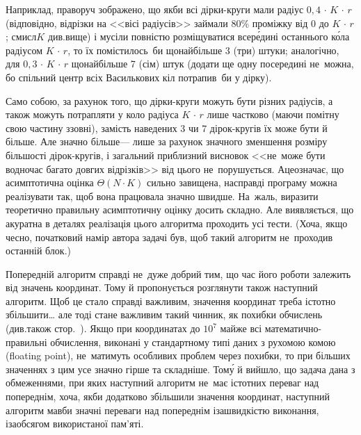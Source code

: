 Наприклад, праворуч зображено, що якби всі дірки-круги мали радіус ${0{,}4\,{\cdot}\,K\,{\cdot}\,r}$ (відповідно, відрізки на <<вісі радіусів>> займали 80\% проміжку від 0 до ${K\,{\cdot}\,r}$; смисл\nolinebreak[3] $K$ див.\nolinebreak[2] вище) і мусіли повністю розміщуватися всер\'{е}дині останнього к\'{о}ла радіусом ${K\,{\cdot}\,r}$, то їх помістилось~би щонайбільше 3 (три) штуки; аналогічно, для ${0{,}3\,{\cdot}\,K\,{\cdot}\,r}$ щонайбільше 7 (сім) штук (додати ще одну посередині не~можна, бо спільний центр всіх Василькових кіл потрапив~би у дірку).

Само собою, за рахунок того, що дірки-круги можуть бути різних радіусів, а також можуть потрапляти у коло радіуса ${K\,{\cdot}\,r}$ лише частково (маючи помітну свою частину ззовні), замість наведених 3 чи 7 дірок-кругів їх може бути й більше. Але значно більше\nolinebreak[3] --- лише за рахунок значного зменшення розміру більшості дірок-кругів, і загальний приблизний висновок <<не~може бути водночас багато довгих відрізків>> від цього не~порушується. А\nolinebreak[2] це\nolinebreak[2] означає, що асимптотична оцінка $\Theta(N\cdot{}K)$ сильно завищена, насправді програму можна реалізувати так, щоб вона працювала значно швидше. На~жаль, виразити теоретично правильну асимптотичну оцінку досить складно. Але виявляється, що акуратна в деталях реалізація цього алгоритма проходить усі тести. (Хоча, якщо чесно, початковий намір автора задачі був, щоб такий алгоритм не~проходив останній блок.)



Попередній алгоритм справді не~дуже добрий тим, що час його роботи залежить від значень координат. Тому й пропонується розглянути також наступний алгоритм. Щоб це стало справді важливим, значення координат треба істотно збільшити\dots{} але тоді стане важливим такий чинник, як похибки обчислень (див.\nolinebreak[3] також стор.~\pageref{???}). Якщо при координатах до $10^7$ майже всі мате\-ма\-тично-пра\-ви\-льні обчислення, виконані у стандартному типі даних з рухомою комою (floating point), не~матимуть особливих проблем через похибки, то при більших значеннях з цим усе значно гірше та складніше. Том\'{у} й вийшло, що задача дана з обмеженнями, при яких наступний алгоритм не~має істотних переваг над попереднім, хоча, якби додатково збільшили значення координат, наступний алгоритм мав\nolinebreak[3] би значні переваги над попереднім і\nolinebreak[3] за\nolinebreak[3] швидкістю виконання, і\nolinebreak[3] за\nolinebreak[3] обсягом використаної пам'яті.

